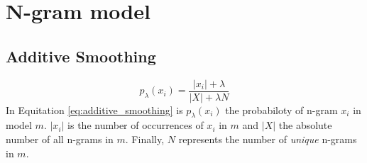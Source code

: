 \documentclass[10pt,a4paper]{article}
\begin{document}
\section{N-gram model}
\subsection{Additive Smoothing}
\begin{equation}
\label{eq:additive_smoothing}
p_{\lambda}(x_i)=\frac{|x_i|+\lambda}{|X|+\lambda N}
\end{equation}
In Equitation \ref{eq:additive_smoothing} is $p_\lambda(x_i)$ the probabiloty of n-gram $x_i$ in model $m$.
$|x_i|$ is the number of occurrences of $x_i$ in $m$ and $|X|$ the absolute number of all n-grams in $m$.
Finally, $N$ represents the number of \emph{unique} n-grams in $m$.
\end{document}
